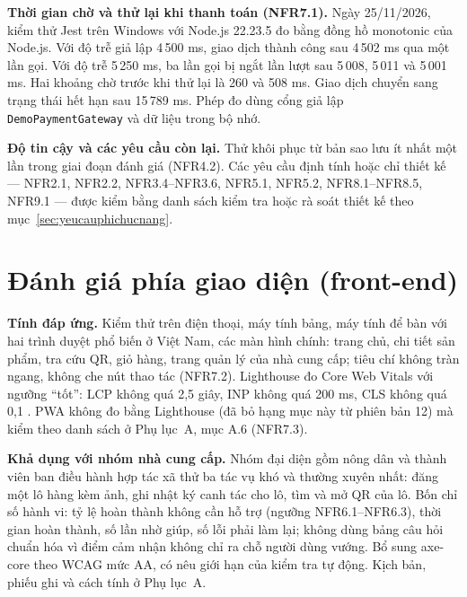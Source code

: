 \noindent\textbf{Thời gian chờ và thử lại khi thanh toán (NFR7.1).} Ngày 25/11/2026, kiểm thử Jest trên Windows với Node.js 22.23.5 đo bằng đồng hồ monotonic của Node.js. Với độ trễ giả lập 4\,500 ms, giao dịch thành công sau 4\,502 ms qua một lần gọi. Với độ trễ 5\,250 ms, ba lần gọi bị ngắt lần lượt sau 5\,008, 5\,011 và 5\,001 ms. Hai khoảng chờ trước khi thử lại là 260 và 508 ms. Giao dịch chuyển sang trạng thái hết hạn sau 15\,789 ms. Phép đo dùng cổng giả lập \texttt{DemoPaymentGateway} và dữ liệu trong bộ nhớ.

\noindent\textbf{Độ tin cậy và các yêu cầu còn lại.} Thử khôi phục từ bản sao lưu ít nhất một lần trong giai đoạn đánh giá (NFR4.2). Các yêu cầu định tính hoặc chỉ thiết kế --- NFR2.1, NFR2.2, NFR3.4--NFR3.6, NFR5.1, NFR5.2, NFR8.1--NFR8.5, NFR9.1 --- được kiểm bằng danh sách kiểm tra hoặc rà soát thiết kế theo mục~\ref{sec:yeucauphichucnang}.


\section{Đánh giá phía giao diện (front-end)}
\label{sec:danhgiaux}

\noindent\textbf{Tính đáp ứng.} Kiểm thử trên điện thoại, máy tính bảng, máy tính để bàn với hai trình duyệt phổ biến ở Việt Nam, các màn hình chính: trang chủ, chi tiết sản phẩm, tra cứu QR, giỏ hàng, trang quản lý của nhà cung cấp; tiêu chí không tràn ngang, không che nút thao tác (NFR7.2). Lighthouse đo Core Web Vitals với ngưỡng ``tốt'': LCP không quá 2,5 giây, INP không quá 200 ms, CLS không quá 0,1 \parencite{webdev_vitals}. PWA không đo bằng Lighthouse (đã bỏ hạng mục này từ phiên bản 12) mà kiểm theo danh sách ở Phụ lục~A, mục A.6 (NFR7.3).

\noindent\textbf{Khả dụng với nhóm nhà cung cấp.} Nhóm đại diện gồm nông dân và thành viên ban điều hành hợp tác xã thử ba tác vụ khó và thường xuyên nhất: đăng một lô hàng kèm ảnh, ghi nhật ký canh tác cho lô, tìm và mở QR của lô. Bốn chỉ số hành vi: tỷ lệ hoàn thành không cần hỗ trợ (ngưỡng NFR6.1--NFR6.3), thời gian hoàn thành, số lần nhờ giúp, số lỗi phải làm lại; không dùng bảng câu hỏi chuẩn hóa vì điểm cảm nhận không chỉ ra chỗ người dùng vướng. Bổ sung axe-core theo WCAG mức AA, có nêu giới hạn của kiểm tra tự động. Kịch bản, phiếu ghi và cách tính ở Phụ lục~A.

